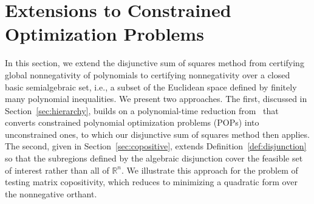 \documentclass[12pt]{article}
\newcommand{\reals}{\mathbb{R}}
\newcommand{\DiSOSL}{\text{NC}}
\newcommand{\mcV}{\mathcal{V}}
\theoremstyle{remark}
\begin{document}










\section{Extensions to Constrained Optimization Problems}
\label{sec:constrained_opt}
In this section, we extend the disjunctive sum of squares method from certifying global nonnegativity of polynomials to certifying nonnegativity over a closed basic semialgebraic set, i.e., a subset of the Euclidean space defined by finitely many polynomial inequalities. 
We present two approaches. The first, discussed in Section~\ref{sec:hierarchy}, builds on a polynomial-time reduction from~\cite{aaa2019} that converts constrained polynomial optimization problems (POPs) into unconstrained ones, to which our disjunctive sum of squares method then applies. The second, given in Section~\ref{sec:copositive}, extends Definition~\ref{def:disjunction} so that the subregions defined by the algebraic disjunction cover the feasible set of interest rather than all of $\reals^n$. We illustrate this approach for the problem of testing matrix copositivity, which reduces to minimizing a quadratic form over the nonnegative orthant.
\end{document}
